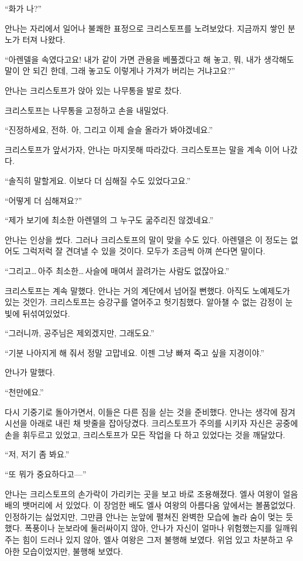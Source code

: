 ``화가 나?''

안나는 자리에서 일어나 불쾌한 표정으로 크리스토프를 노려보았다. 지금까지 쌓인 분노가 터져 나왔다.

``아렌델을 속였다고요! 내가 같이 가면 관용을 베풀겠다고 해 놓고, 뭐, 내가 생각해도 말이 안 되긴 한데, 그래 놓고도 이렇게나 가져가 버리는 거냐고요?''

안나는 크리스토프가 앉아 있는 나무통을 발로 찼다.

크리스토프는 나무통을 고정하고 손을 내밀었다.

``진정하세요, 전하. 아, 그리고 이제 슬슬 올라가 봐야겠네요.''

크리스토프가 앞서가자, 안나는 마지못해 따라갔다. 크리스토프는 말을 계속 이어 나갔다.

``솔직히 말할게요. 이보다 더 심해질 수도 있었다고요.''

``어떻게 더 심해져요?''

``제가 보기에 최소한 아렌델의 그 누구도 굶주리진 않겠네요.''

안나는 인상을 썼다. 그러나 크리스토프의 말이 맞을 수도 있다. 아렌델은 이 정도는 없어도 그럭저럭 잘 견뎌낼 수 있을 것이다. 모두가 조금씩 아껴 쓴다면 말이다.

``그리고\ldots\,아주 최소한\ldots\,사슬에 매여서 끌려가는 사람도 없잖아요.''

크리스토프는 계속 말했다. 안나는 거의 계단에서 넘어질 뻔했다. 아직도 노예제도가 있는 것인가. 크리스토프는 승강구를 열어주고 헛기침했다. 알아챌 수 없는 감정이 눈빛에 뒤섞여있었다.

``그러니까, 공주님은 제외겠지만, 그래도요.''

``기분 나아지게 해 줘서 정말 고맙네요. 이젠 그냥 빠져 죽고 싶을 지경이야.''

안나가 말했다.

``천만에요.''

다시 기중기로 돌아가면서, 이들은 다른 짐을 싣는 것을 준비했다. 안나는 생각에 잠겨 시선을 아래로 내린 채 밧줄을 잡아당겼다. 크리스토프가 주의를 시키자 자신은 공중에 손을 휘두르고 있었고, 크리스토프가 모든 작업을 다 하고 있었다는 것을 깨달았다.

``저, 저기 좀 봐요.''

``또 뭐가 중요하다고—''

안나는 크리스토프의 손가락이 가리키는 곳을 보고 바로 조용해졌다. 엘사 여왕이 얼음 배의 뱃머리에 서 있었다. 이 장엄한 배도 엘사 여왕의 아름다움 앞에서는 볼품없었다. 인정하기는 싫었지만, 그만큼 안나는 눈앞에 펼쳐진 완벽한 모습에 놀라 숨이 멎는 듯했다. 폭풍이나 눈보라에 둘러싸이지 않아, 안나가 자신이 얼마나 위험했는지를 일깨워주는 힘이 드러나 있지 않아, 엘사 여왕은 그저 불행해 보였다. 위엄 있고 차분하고 우아한 모습이었지만, 불행해 보였다.

